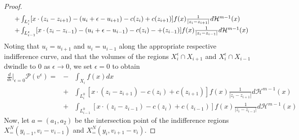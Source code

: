 \documentclass[10pt,a4paper]{amsart}
\begin{document}
\begin{proof}
\[\begin{array}{ll}
     &+\int_{L^\epsilon_{i}}[x \cdot (z_{i}-z_{i+1}) - (u_{i}+\epsilon-u_{i+1}) -c(z_{i}) +c(z_{i+1}) ]f(x)\frac{1}{|z_i-z_{i+1}|}d\mathcal H^{m-1}(x)\vspace{3pt}\\
     &+
     \int_{L^\epsilon_{i-1}}[x \cdot (z_{i}-z_{i-1}) - (u_{i}+\epsilon-u_{i-1}) -c(z_{i}) -+(z_{i-1}) ]f(x)\frac{1}{|z_i-z_{i-1}|}d\mathcal H^{m-1}(x)
 \end{array}
 \]
Noting that $u_i=u_{i+1}$ and $u_i =u_{i-1}$ along the appropriate respective indifference curve, and that the volumes of the regions $X_{i}^\epsilon \cap X_{i+1}$ and $X_{i}^\epsilon \cap X_{i-1}$  dwindle to $0$ as $\epsilon \rightarrow 0$, we set $\epsilon =0$ to obtain
\begin{eqnarray}\label{optcond1}
         \frac{d}{d\epsilon}\Big|_{\epsilon=0} \mathcal P(v^\epsilon)  =
         &-&\int_{X_i}f(x)dx\label{derivative} \\
      &+&\int_{L^0_{i}}[x \cdot (z_{i}-z_{i+1})-c(z_{i}) +c(z_{i+1}) ]f(x)\frac{1}{|z_i-z_{i+1}|}d\mathcal H^{m-1}(x) \nonumber\\
&+&     \int_{L^0_{i-1}}[x \cdot (z_{i}-z_{i-1})-c(z_i) + c(z_{i-1}) ]f(x)\frac{1}{|z_i-z_{i-1}|}d\mathcal H^{m-1}(x) \nonumber
\end{eqnarray}
Now, let $a=(a_1,a_2)$ be the intersection point of the indifference regions $X^N_=(y_{i-1}, v_{i} - v_{i-1})$ and $X^N_=(y_i, v_{i+1} - v_{i})$.  






\end{proof}
\end{document}
